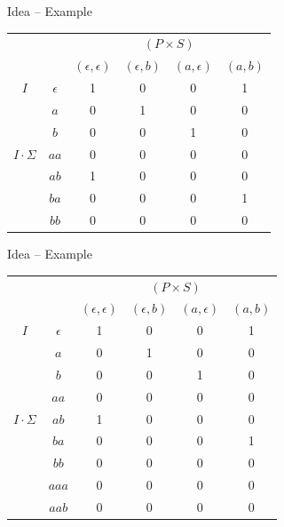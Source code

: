 \documentclass{beamer}
\begin{document}

\begin{frame}{Idea -- Example}
    \begin{center}
        \begin{tabular}{|cc|c|c|c|c|} 
            \multicolumn{2}{c|}{} & \multicolumn{4}{c|}{$(P\times S)$} \\
            \multicolumn{2}{c|}{} & $(\epsilon,\epsilon)$ & $(\epsilon,b)$ & $(a,\epsilon)$ & $(a,b)$ \\ \hline
            $I$ & $\epsilon$ & 1 & 0 & 0 & 1 \\ 
                & $a$ & 0 & 1 & 0 & 0 \\
                & $b$ & 0 & 0 & 1 & 0 \\ \hline
            $I \cdot \Sigma$ & $aa$ & 0 & 0 & 0 & 0 \\ 
                & $ab$ & 1 & 0 & 0 & 0 \\
                & $ba$ & 0 & 0 & 0 & 1 \\
                & $bb$ & 0 & 0 & 0 & 0 \\ \hline
        \end{tabular}
    \end{center}
\end{frame}


\begin{frame}{Idea -- Example}
    \begin{center}
        \begin{tabular}{|cc|c|c|c|c|} 
    \multicolumn{2}{c|}{} & \multicolumn{4}{c|}{$(P\times S)$} \\
    \multicolumn{2}{c|}{} & $(\epsilon,\epsilon)$ & $(\epsilon,b)$ & $(a,\epsilon)$ & $(a,b)$ \\ \hline
    $I$ & $\epsilon$ & 1 & 0 & 0 & 1 \\ 
        & $a$        & 0 & 1 & 0 & 0 \\
        & $b$        & 0 & 0 & 1 & 0 \\ 
        & $aa$       & 0 & 0 & 0 & 0 \\ \hline
    $I \cdot \Sigma$ & $ab$  & 1 & 0 & 0 & 0 \\
        & $ba$       & 0 & 0 & 0 & 1 \\
        & $bb$       & 0 & 0 & 0 & 0 \\ 
        & $aaa$      & 0 & 0 & 0 & 0 \\ 
        & $aab$      & 0 & 0 & 0 & 0 \\ \hline
\end{tabular}
    \end{center}
\end{frame}
\end{document}
